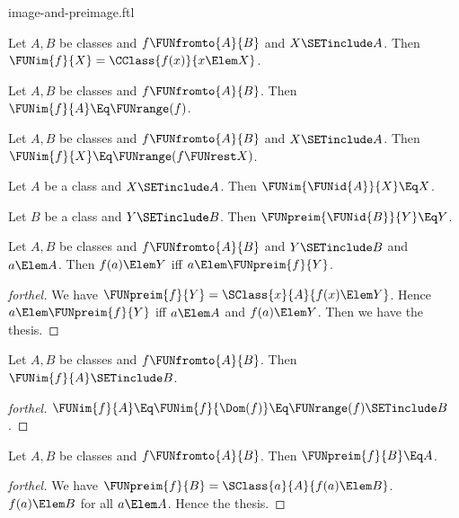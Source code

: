 \documentclass{stex}
\begin{document}
\begin{smodule}{image-and-preimage.ftl}

\begin{proposition}[forthel]
  Let $A, B$ be classes and $f \FUNfromto{A}{B}$ and $X \SETinclude A$.
  Then $\FUNim{f}{X} = \CClass{f(x)}{x \Elem X}$.
\end{proposition}

\begin{corollary}[forthel]
  Let $A, B$ be classes and $f \FUNfromto{A}{B}$.
  Then $\FUNim{f}{A} \Eq \FUNrange(f)$.
\end{corollary}

\begin{corollary}[forthel]
  Let $A, B$ be classes and $f \FUNfromto{A}{B}$ and $X \SETinclude A$.
  Then $\FUNim{f}{X} \Eq \FUNrange(f \FUNrest X)$.
\end{corollary}

\begin{proposition}[forthel]
  Let $A$ be a class and $X \SETinclude A$.
  Then $\FUNim{\FUNid{A}}{X} \Eq X$.
\end{proposition}

\begin{proposition}[forthel]
  Let $B$ be a class and $Y \SETinclude B$.
  Then $\FUNpreim{\FUNid{B}}{Y} \Eq Y$.
\end{proposition}

\begin{proposition}[forthel]
  Let $A, B$ be classes and $f \FUNfromto{A}{B}$ and $Y \SETinclude B$ and $a \Elem A$.
  Then $f(a) \Elem Y$ iff $a \Elem \FUNpreim{f}{Y}$.
\end{proposition}
\begin{proof}[forthel]
  We have $\FUNpreim{f}{Y} = \SClass{x}{A}{f(x) \Elem Y}$.
  Hence $a \Elem \FUNpreim{f}{Y}$ iff $a \Elem A$ and $f(a) \Elem Y$.
  Then we have the thesis.
\end{proof}

\begin{proposition}[forthel]
  Let $A, B$ be classes and $f \FUNfromto{A}{B}$.
  Then $\FUNim{f}{A} \SETinclude B$.
\end{proposition}
\begin{proof}[forthel]
  $\FUNim{f}{A}
    \Eq \FUNim{f}{\Dom(f)}
    \Eq \FUNrange(f)
    \SETinclude B$.
\end{proof}

\begin{proposition}[forthel]
  Let $A, B$ be classes and $f \FUNfromto{A}{B}$.
  Then $\FUNpreim{f}{B} \Eq A$.
\end{proposition}
\begin{proof}[forthel]
  We have $\FUNpreim{f}{B} = \SClass{a}{A}{f(a) \Elem B}$.
  $f(a) \Elem B$ for all $a \Elem A$.
  Hence the thesis.
\end{proof}


\end{smodule}
\end{document}
